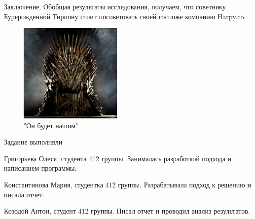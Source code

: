 \documentclass{beamer}
\begin{document}
\begin{frame}{Заключение. }
Обобщая результаты  исследования, получаем, что советнику Бурерожденной Тириону стоит посоветовать своей госпоже компанию Harpy.co.  
\begin{figure}[h]
		\includegraphics[width=50mm]{tron}
		\caption{"Он будет нашим"}
		\label{tron}
	\end{figure}

\end{frame}

\begin{frame}{Задание выполняли}
	\begin{itemize}
		{\tiny \item Григорьева Олеся, студента 412 группы. Занималась разработкой подхода и написанием программы.
		\item Константинова Мария, студентка 412 группы. Разрабатывала подход к решению и писала отчет.
		\item Козодой Антон, студент 412 группы. Писал отчет и проводил анализ результатов.
				}
	\end{itemize}	
	

\end{frame}
\end{document}
